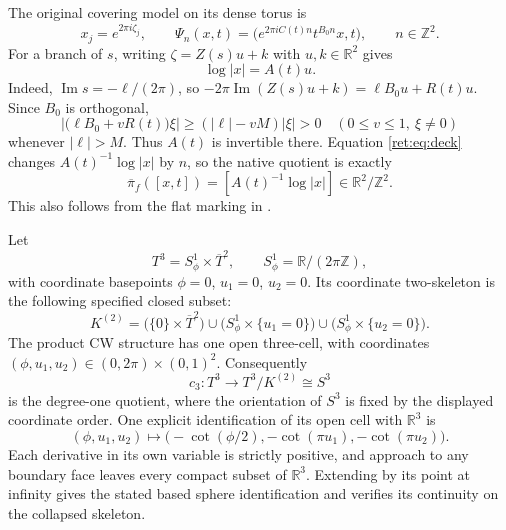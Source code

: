 \documentclass[11pt]{article}
\theoremstyle{definition}
\begin{document}
The original covering model on its dense torus is
\begin{equation}
 x_j=e^{2\pi i\zeta_j},\qquad
 \Psi_n(x,t)=
 \bigl(e^{2\pi i C(t)n}t^{B_0n}x,t\bigr),\qquad n\in\mathbb Z^2.
 \label{ret:eq:deck}
\end{equation}
For a branch of \(s\), writing
\(\zeta=Z(s)u+k\) with \(u,k\in\mathbb R^2\) gives
\begin{equation}
 \log|x|=A(t)u.
 \label{ret:eq:logx}
\end{equation}
Indeed, \(\operatorname{Im}s=-\ell/(2\pi)\), so
\(-2\pi\operatorname{Im}(Z(s)u+k)=\ell B_0u+R(t)u\).
Since \(B_0\) is orthogonal,
\begin{equation}
 \bigl|\bigl(\ell B_0+vR(t)\bigr)\xi\bigr|
 \geq (|\ell|-vM)|\xi|>0
 \quad(0\leq v\leq1,\ \xi\ne0)
 \label{ret:eq:invertibility}
\end{equation}
whenever \(|\ell|>M\).  Thus \(A(t)\) is invertible there.  Equation
\eqref{ret:eq:deck} changes \(A(t)^{-1}\log|x|\) by \(n\), so the native
quotient is exactly
\begin{equation}
 \overline\pi_f([x,t])=[A(t)^{-1}\log|x|]\in\mathbb R^2/\mathbb Z^2.
 \label{ret:eq:native}
\end{equation}
This also follows from the flat marking in \cite{retbib:ConeRoutes}.

Let
\[
 T^3=S^1_\phi\times\overline T^2,
 \qquad S^1_\phi=\mathbb R/(2\pi\mathbb Z),
\]
with coordinate basepoints \(\phi=0\), \(u_1=0\), \(u_2=0\).
Its coordinate two-skeleton is the following specified closed subset:
\begin{equation}
 K^{(2)}=
 \bigl(\{0\}\times\overline T^2\bigr)
 \cup\bigl(S^1_\phi\times\{u_1=0\}\bigr)
 \cup\bigl(S^1_\phi\times\{u_2=0\}\bigr).
 \label{ret:eq:two-skeleton}
\end{equation}
The product CW structure has one open three-cell, with coordinates
\((\phi,u_1,u_2)\in(0,2\pi)\times(0,1)^2\).  Consequently
\[
 c_3:T^3\longrightarrow T^3/K^{(2)}\cong S^3
\]
is the degree-one quotient, where the orientation of \(S^3\) is fixed
by the displayed coordinate order.  One explicit identification of its
open cell with \(\mathbb R^3\) is
\[
 (\phi,u_1,u_2)\longmapsto
 \bigl(-\cot(\phi/2),-\cot(\pi u_1),-\cot(\pi u_2)\bigr).
\]
Each derivative in its own variable is strictly positive, and approach
to any boundary face leaves every compact subset of \(\mathbb R^3\).
Extending by its point at infinity gives the stated based sphere
identification and verifies its continuity on the collapsed skeleton.
\end{document}
